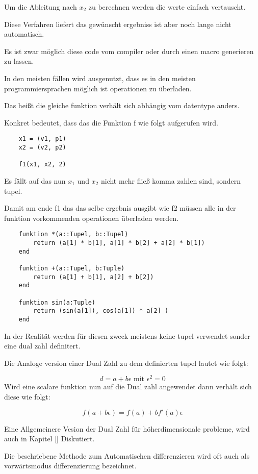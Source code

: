 Um die Ableitung nach $x_2$ zu berechnen werden die werte einfach vertauscht.

Diese Verfahren liefert das gewünscht ergebniss ist aber noch lange nicht automatisch.

Es ist zwar möglich diese code vom compiler oder durch einen macro generieren zu lassen.

In den meisten fällen wird ausgenutzt, dass es in den meisten 
programmiersprachen möglich ist operationen zu überladen.

Das heißt die gleiche funktion verhält sich abhängig vom datentype anders.

Konkret bedeutet, dass das die Funktion f wie folgt aufgerufen wird.

\begin{lstlisting}
	x1 = (v1, p1)
    x2 = (v2, p2)
    
    f1(x1, x2, 2)
\end{lstlisting}


Es fällt auf das nun $x_1$ und $x_2$ nicht mehr fließ komma zahlen sind, sondern tupel.

Damit am ende f1 das das selbe ergebnis ausgibt wie f2 müssen alle in der funktion vorkommenden operationen überladen werden.

\begin{lstlisting}
	funktion *(a::Tupel, b::Tupel)
    	return (a[1] * b[1], a[1] * b[2] + a[2] * b[1]) 
    end
    
    funktion +(a::Tupel, b:Tuple)
    	return (a[1] + b[1], a[2] + b[2])
    end
    
    funktion sin(a:Tuple)
    	return (sin(a[1]), cos(a[1]) * a[2] ) 
    end
\end{lstlisting}


In der Realität werden für diesen zweck meistens keine tupel verwendet sonder eine dual zahl definitert.

Die Analoge version einer Dual Zahl zu dem definierten tupel lautet wie folgt:

$$
	d = a + b \epsilon \text{ mit } \epsilon^2 = 0
$$
Wird eine scalare funktion nun auf die Dual zahl angewendet dann verhält sich diese wie folgt:

$$
	f( a + b \epsilon) = f(a) + b f'(a) \epsilon
$$

Eine Allgemeinere Vesion der Dual Zahl für höherdimensionale probleme, wird auch in Kapitel \ref{} Diskutiert.

Die beschriebene Methode zum Automatischen differenzieren wird oft auch als vorwärtsmodus differenzierung bezeichnet.

